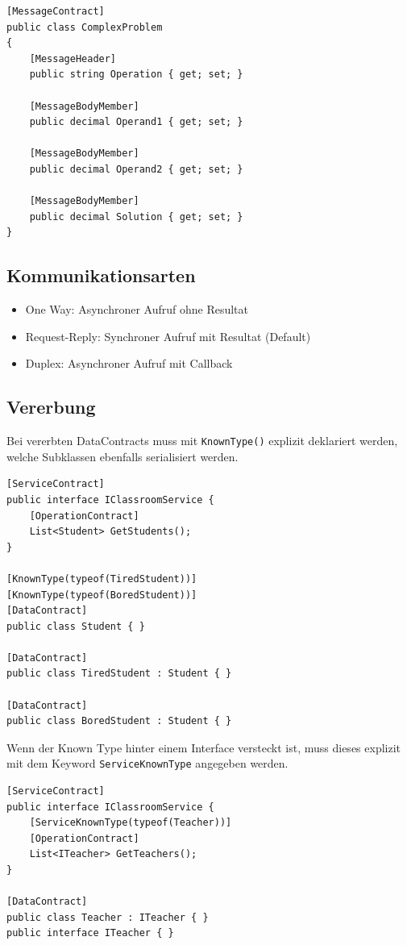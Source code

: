 \documentclass[
a4paper,
oneside,
10pt,
fleqn,
headsepline,
toc=listofnumbered, 
bibliography=totocnumbered]{scrartcl}
\begin{document}
\begin{lstlisting}[caption=Message Contract]
[MessageContract]
public class ComplexProblem
{
    [MessageHeader]
    public string Operation { get; set; }
    
    [MessageBodyMember]
    public decimal Operand1 { get; set; }
    
    [MessageBodyMember]
    public decimal Operand2 { get; set; }
    
    [MessageBodyMember]
    public decimal Solution { get; set; }
}

\end{lstlisting}

\subsection{Kommunikationsarten}

\begin{itemize}
    \item One Way: Asynchroner Aufruf ohne Resultat
    \item Request-Reply: Synchroner Aufruf mit Resultat (Default)
    \item Duplex: Asynchroner Aufruf mit Callback
\end{itemize}

\subsection{Vererbung}
Bei vererbten DataContracts muss mit \lstinline|KnownType()| explizit deklariert werden, welche Subklassen ebenfalls serialisiert werden.
\begin{lstlisting}[caption=Data Contract Vererbung]
[ServiceContract]
public interface IClassroomService {
	[OperationContract]
	List<Student> GetStudents();
}

[KnownType(typeof(TiredStudent))]
[KnownType(typeof(BoredStudent))]
[DataContract]
public class Student { }

[DataContract]
public class TiredStudent : Student { }

[DataContract]
public class BoredStudent : Student { }
\end{lstlisting}

Wenn der Known Type hinter einem Interface versteckt ist, muss dieses explizit mit dem Keyword \lstinline|ServiceKnownType| angegeben werden.
\begin{lstlisting}[caption=Service Known Data Contract Vererbung]
[ServiceContract]
public interface IClassroomService {
	[ServiceKnownType(typeof(Teacher))]
	[OperationContract]
	List<ITeacher> GetTeachers();
}

[DataContract]
public class Teacher : ITeacher { }
public interface ITeacher { }
\end{lstlisting}
\end{document}
